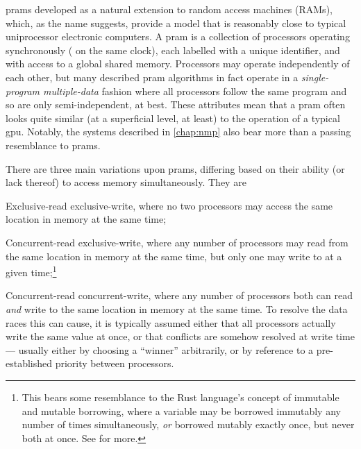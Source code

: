 \Glspl{pram} developed as a natural extension to random access machines (RAMs), which, as the name suggests, provide a model that is reasonably close to typical uniprocessor electronic computers.  A \gls{pram} is a collection of processors operating synchronously (\ie{} on the same clock), each labelled with a unique identifier, and with access to a global shared memory.  Processors may operate independently of each other, but many described \gls{pram} algorithms in fact operate in a \emph{single-program multiple-data} fashion where all processors follow the same program and so are only semi-independent, at best.  These attributes mean that a \gls{pram} often looks quite similar (at a superficial level, at least) to the operation of a typical \gls{gpu}.  Notably, the systems described in \cref{chap:nmp} also bear more than a passing resemblance to \glspl{pram}.

There are three main variations upon \glspl{pram}, differing based on their ability (or lack thereof) to access memory simultaneously.  They are
\begin{inparaenum}[(i)]
\item Exclusive-read exclusive-write, where no two processors may access the same location in memory at the same time;
\item Concurrent-read exclusive-write, where any number of processors may read from the same location in memory at the same time, but only one may write to at a given time;\footnote{This bears some resemblance to the Rust language's concept of immutable and mutable borrowing, where a variable may be borrowed immutably any number of times simultaneously, \emph{or} borrowed mutably exactly once, but never both at once.  See \cite[Ch.~4.2]{Klabnik2019} for more.}
\item Concurrent-read concurrent-write, where any number of processors both can read \emph{and} write to the same location in memory at the same time.  To resolve the data races this can cause, it is typically assumed either that all processors actually write the same value at once, or that conflicts are somehow resolved at write time --- usually either by choosing a ``winner'' arbitrarily, or by reference to a pre-established priority between processors.
\end{inparaenum}


